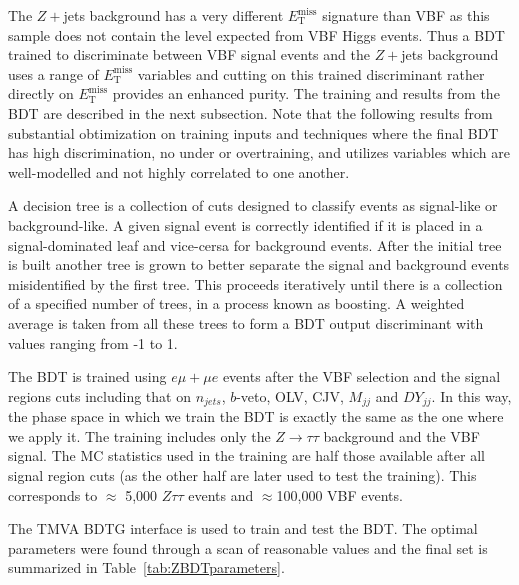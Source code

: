 
The $Z+$jets background has a very different $E_{\text{T}}^{\text{miss}}$ signature than VBF as this sample does not contain the level expected from VBF Higgs events. Thus a BDT trained to discriminate between VBF signal events and the $Z+$jets background uses a range of $E_{\text{T}}^{\text{miss}}$ variables and cutting on this trained discriminant rather directly on $E_{\text{T}}^{\text{miss}}$ provides an enhanced purity. The training and results from the BDT are described in the next subsection. Note that the following results from substantial obtimization on training inputs and techniques where the final BDT has high discrimination, no under or overtraining, and utilizes variables which are well-modelled and not highly correlated to one another.  

A decision tree is a collection of cuts designed to classify events as signal-like or background-like. A given signal event is correctly identified if it is placed in a signal-dominated leaf and vice-cersa for background events. After the initial tree is built another tree is grown to better separate the signal and background events misidentified by the first tree. This proceeds iteratively until there is a collection of a specified number of trees, in a process known as boosting. A weighted average is taken from all these trees to form a BDT output discriminant with values ranging from -1 to 1.

The BDT is trained using $e\mu+\mu e$ events after the VBF selection and the signal regions cuts including that on $n_{jets}$, $b$-veto, OLV, CJV, $M_{jj}$ and $DY_{jj}$. In this way, the phase space in which we train the BDT is exactly the same as the one where we apply it. The training includes only the $Z\rightarrow\tau\tau$ background and the VBF signal. The MC statistics used in the training are half those available after all signal region cuts (as the other half are later used to test the training). This corresponds to $\approx$ 5,000 $Z\tau\tau$ events and $\approx$100,000 VBF events.

The TMVA BDTG interface is used to train and test the BDT. The optimal parameters were found through a scan of reasonable values and the final set is summarized in Table~\ref{tab:ZBDTparameters}.

